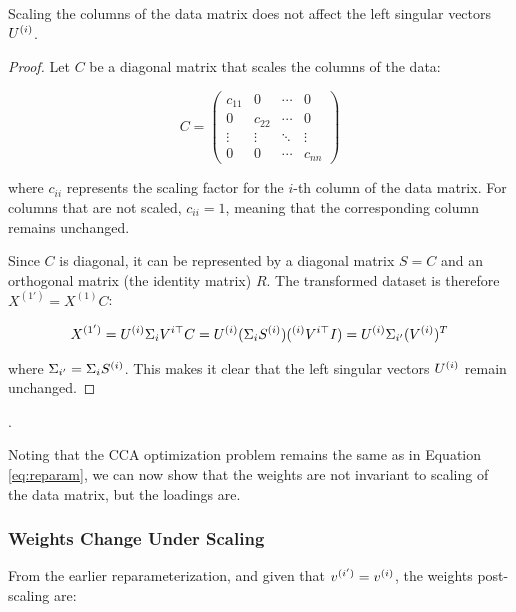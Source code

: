 \begin{lemma}
Scaling the columns of the data matrix does not affect the left singular vectors $U^{(i)}$.
\end{lemma}

\begin{proof}
Let $C$ be a diagonal matrix that scales the columns of the data:

\begin{equation}
    C = \begin{pmatrix}
            c_{11} & 0      & \cdots & 0      \\
            0      & c_{22} & \cdots & 0      \\
            \vdots & \vdots & \ddots & \vdots \\
            0      & 0      & \cdots & c_{nn}
    \end{pmatrix}
\end{equation}

where \( c_{ii} \) represents the scaling factor for the \( i \)-th column of the data matrix. For columns that are not scaled, \( c_{ii} = 1 \), meaning that the corresponding column remains unchanged.

Since $C$ is diagonal, it can be represented by a diagonal matrix $S=C$ and an orthogonal matrix (the identity matrix) $R$. The transformed dataset is therefore \( X^{(1')} = X^{(1)}C \):

\begin{align}
    X^{(1')} = U^{(i)}\Sigma_{i}V^{i\top}C = U^{(i)}(\Sigma_{i} S^{(i)}) (^{(i)}V^{i\top}I) = U^{(i)} \Sigma_{i'} (V^{(i)})^T \label{eq:scaled_data}
\end{align}

where $\Sigma_{i'}=\Sigma_{i} S^{(i)}$. This makes it clear that the left singular vectors \( U^{(i)} \) remain unchanged.
\end{proof}.

Noting that the CCA optimization problem remains the same as in Equation \ref{eq:reparam}, we can now show that the weights are not invariant to scaling of the data matrix, but the \gls{loadings} are.

\subsubsection{Weights Change Under Scaling}

From the earlier reparameterization, and given that $v^{(i')}=v^{(i)}$, the weights post-scaling are:

